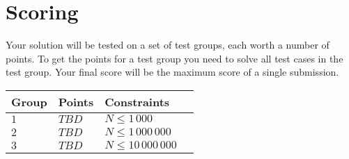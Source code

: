 \section*{Scoring}
Your solution will be tested on a set of test groups, each worth a number of points.
To get the points for a test group you need to solve all test cases in the test group.
Your final score will be the maximum score of a single submission.

\noindent
\begin{tabular}{| l | l | l | l |}
\hline
Group & Points & Constraints \\ \hline
$1$    & $TBD$         & $N \le 1\,000$ \\ \hline
$2$    & $TBD$         & $N \le 1\,000\,000$ \\ \hline
$3$    & $TBD$         & $N \le 10\,000\,000$ \\ \hline
\end{tabular}
